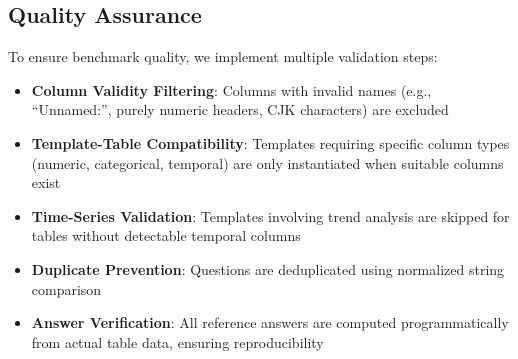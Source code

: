 
\subsection{Quality Assurance}
\label{sec:quality}
To ensure benchmark quality, we implement multiple validation steps:
\begin{itemize}
    \setlength{\itemsep}{0pt}
    \setlength{\parskip}{0pt}
    \setlength{\parsep}{0pt}
    \item \textbf{Column Validity Filtering}: Columns with invalid names (e.g., ``Unnamed:'', purely numeric headers, CJK characters) are excluded
    \item \textbf{Template-Table Compatibility}: Templates requiring specific column types (numeric, categorical, temporal) are only instantiated when suitable columns exist
    \item \textbf{Time-Series Validation}: Templates involving trend analysis are skipped for tables without detectable temporal columns
    \item \textbf{Duplicate Prevention}: Questions are deduplicated using normalized string comparison
    \item \textbf{Answer Verification}: All reference answers are computed programmatically from actual table data, ensuring reproducibility
\end{itemize}

